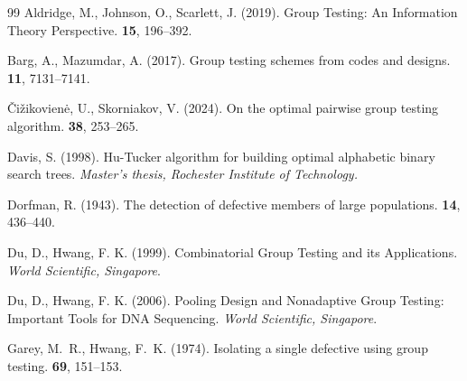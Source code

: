 \documentclass[12pt]{article}
\begin{document}
\begin{thebibliography}{99}
Aldridge, M.,  Johnson, O., Scarlett, J. (2019).
\newblock Group Testing: An Information Theory Perspective.
 {\textbf{15},} 196--392.




Barg, A., Mazumdar, A. (2017).
\newblock Group testing schemes from codes and designs.
 {\textbf{11},} 7131--7141.





 \v{C}i\v{z}ikovien\.{e}, U., Skorniakov, V. (2024).
\newblock On the optimal pairwise group testing algorithm.
 {\textbf{38},} 253--265.







Davis, S. (1998).
\newblock Hu-Tucker algorithm for building optimal alphabetic binary search
  trees.
{\it  Master's thesis, Rochester Institute of Technology.}



Dorfman, R. (1943).
\newblock The detection of defective members of large populations.
 {\textbf{14},} 436--440.

Du, D., Hwang, F. K. (1999).
\newblock Combinatorial Group Testing and its Applications. {\it World
Scientific, Singapore}.

Du, D., Hwang, F. K. (2006).
\newblock Pooling Design and Nonadaptive Group Testing: Important Tools for DNA Sequencing. {\it World
Scientific, Singapore}.



Garey, M.~R., Hwang, F.~K. (1974).
\newblock Isolating a single defective using group testing.
 {\textbf{69},} 151--153.





\end{thebibliography}
\end{document}
